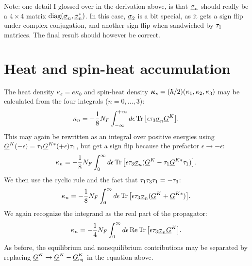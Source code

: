 Note: one detail I glossed over in the derivation above, is that $\S{n}$ should really be a $4\times4$ matrix $\text{diag}(\S{n},\S{n}^*)$.
In this case, $\S{2}$ is a bit special, as it gets a sign flip under complex conjugation, and another sign flip when sandwiched by $\N{1}$ matrices.
The final result should however be correct.

\clearpage
\section{Heat and spin-heat accumulation}
The heat density $\kappa_{e} = e\kappa_0$ and spin-heat density $\B{\kappa}_{s} = (\hbar/2)(\kappa_1, \kappa_2, \kappa_3)$ may be calculated from the four integrals ($n=0,\ldots,3$):
\begin{equation}
  \kappa_n = -\frac{1}{8}N_F  \int_{-\infty}^{+\infty} \d\epsilon \tr\big[ \epsilon\N{3}\S{n} \U{G}^K \big].
\end{equation}
This may again be rewritten as an integral over positive energies using $\U{G}^K(-\epsilon) = \N{1} \U{G}^{K*}(+\epsilon) \N{1}$, but get a sign flip because the prefactor $\epsilon \rightarrow -\epsilon$:
\begin{equation}
  \kappa_n = -\frac{1}{8}N_F  \int_{0}^{\infty} \d\epsilon \tr\big[ \epsilon\N{3}\S{n} (\U{G}^K - \N{1} \U{G}^{K*} \N{1}) \big].
\end{equation}
We then use the cyclic rule and the fact that $\N{1}\N{3}\N{1} = -\N{3}$:
\begin{equation}
  \kappa_n = -\frac{1}{8}N_F  \int_{0}^{\infty} \d\epsilon \tr\big[ \epsilon\N{3}\S{n} (\U{G}^K + \U{G}^{K*}) \big].
\end{equation}
We again recognize the integrand as the real part of the propagator:
\begin{equation}
  \kappa_n = -\frac{1}{4}N_F  \int_{0}^{\infty} \d\epsilon \re\tr\big[ \epsilon\N{3}\S{n} \U{G}^K \big].
\end{equation}
As before, the equilibrium and nonequilibrium contributions may be separated by replacing $\U{G}^K \rightarrow \U{G}^K - \U{G}^K_\text{eq}$ in the equation above.



\clearpage
